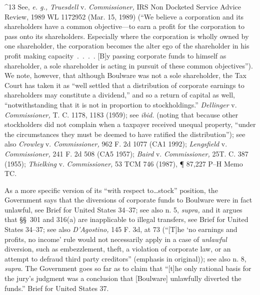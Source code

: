 ^13 See, \emph{e. g., Truesdell} v. \emph{Commissioner,} IRS Non Docketed
Service Advice Review, 1989 WL 1172952 (Mar. 15, 1989) (``We believe
a corporation and its shareholders have a common objective---to
earn a profit for the corporation to pass onto its shareholders.
Especially where the corporation is wholly owned by one shareholder,
the corporation becomes the alter ego of the shareholder in his profit
making capacity~.~.~.~. [B]y passing corporate funds to himself
as shareholder, a sole shareholder is acting in pursuit of these
common objectives''). We note, however, that although Boulware
was not a sole shareholder, the Tax Court has taken it as ``well
settled that a distribution of corporate earnings to shareholders
may constitute a dividend,'' and so a return of capital as well,
``notwithstanding that it is not in proportion to stockholdings.''
\emph{Dellinger} v. \emph{Commissioner,}  T. C. 1178, 1183
(1959); see \emph{ibid.} (noting that because other stockholders did
not complain when a taxpayer received unequal property, ``under the
circumstances they must be deemed to have ratified the distribution'');
see also \emph{Crowley} v. \emph{Commissioner,} 962 F. 2d 1077 (CA1 1992);
\emph{Lengsfield} v. \emph{Commissioner,} 241 F. 2d 508 (CA5 1957);
\emph{Baird} v. \emph{Commissioner,} 25T. C. 387 (1955); \emph{Thielking} v.
\emph{Commissioner,} 53 TCM 746 (1987), ¶ 87,227 P--H Memo TC.

  As a more specific version of its ``with respect to\dots stock''
position, the Government says that the diversions of corporate funds to
Boulware were in fact unlawful, see Brief for United States 34--37;
see also n. 5, \emph{supra,} and it argues that \S\S~301 and 316(a)
are inapplicable to illegal transfers, see Brief for United States
34--37; see also \emph{D'Agostino,} 145 F. 3d, at 73 (``[T]he ‘no
earnings and profits, no income' rule would not necessarily apply in
a case of \emph{unlawful} diversion, such \newpage  as embezzlement, theft,
a violation of corporate law, or an attempt to defraud third party
creditors'' (emphasis in original)); see also n. 8, \emph{supra}. The
Government goes so far as to claim that ``[t]he only rational basis
for the jury's judgment was a conclusion that [Boulware] unlawfully
diverted the funds.'' Brief for United States 37.

